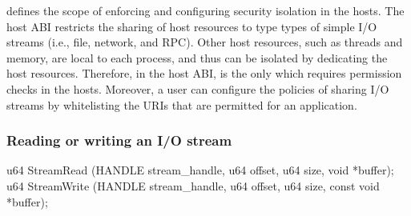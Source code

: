 

 defines the scope of enforcing and configuring security isolation in the hosts.
The host ABI restricts the sharing of host resources
to type types of simple I/O streams (i.e., file, network, and RPC). 
Other host resources, such as threads and memory,
are local to each process, and thus can be isolated by dedicating the host resources.
Therefore, in the host ABI,  is the only \hostapi{}
which requires permission checks in the hosts.
Moreover, a user can configure the policies of sharing I/O streams by
whitelisting the URIs that are permitted for an application.





\subsubsection*{Reading or writing an I/O stream}



\begin{paldef}
u64 StreamRead  (HANDLE stream_handle, u64 offset,
                 u64 size, void *buffer);
u64 StreamWrite (HANDLE stream_handle, u64 offset,
                 u64 size, const void *buffer);
\end{paldef}                   
              
